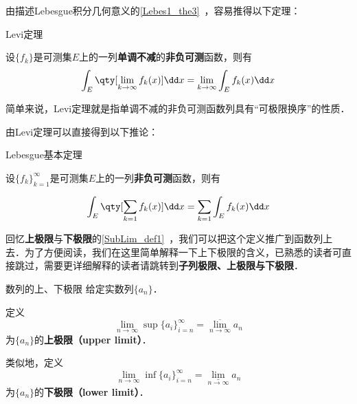 

由描述Lebesgue积分几何意义的\autoref{Lebes1_the3}~，容易推得以下定理：

\begin{theorem}{Levi定理}\label{Lebes2_the1}

设$\{f_k\}$是可测集$E$上的一列\textbf{单调不减}的\textbf{非负可测}函数，则有
\begin{equation}
\int_E  \qty[\lim\limits_{k\to \infty} f_k(x)] \dd x = \lim\limits_{k\to \infty}\int_E f_k(x) \dd x
\end{equation}

\end{theorem}

简单来说，Levi定理就是指单调不减的非负可测函数列具有“可极限换序”的性质．

由Levi定理可以直接得到以下推论：

\begin{corollary}{Lebesgue基本定理}

设$\{f_k\}^\infty_{k=1}$是可测集$E$上的一列\textbf{非负可测}函数，则有

\begin{equation}
\int_E  \qty[\sum\limits_{k=1}f_k(x)] \dd x = \sum\limits_{k=1} \int_E f_k(x) \dd x
\end{equation}

\end{corollary}

回忆\textbf{上极限}与\textbf{下极限}的\autoref{SubLim_def1}~，我们可以把这个定义推广到函数列上去．为了方便阅读，我们在这里简单解释一下上下极限的含义，已熟悉的读者可直接跳过，需要更详细解释的读者请跳转到\textbf{子列极限、上极限与下极限}．

\begin{definition}{数列的上、下极限}\label{Lebes2_def2}
给定实数列$\{a_n\}$．

定义
\begin{equation}
\lim\limits_{n\to\infty} \sup\{a_i\}_{i=n}^\infty = \overline{\lim}\limits_{n\to\infty} a_n
\end{equation}
为$\{a_n\}$的\textbf{上极限（upper limit）}．

类似地，定义
\begin{equation}
\lim\limits_{n\to\infty} \inf\{a_i\}_{i=n}^\infty = \underline{\lim}\limits_{n\to\infty} a_n
\end{equation}
为$\{a_n\}$的\textbf{下极限（lower limit）}．
\end{definition}


